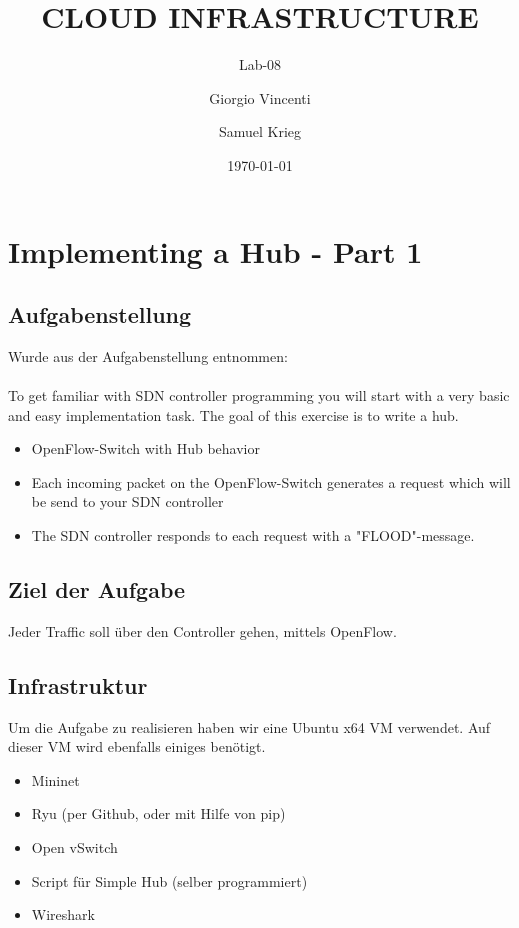 \documentclass[a4,12pt]{scrartcl}
\title{CLOUD INFRASTRUCTURE}
\subtitle{Lab-08}
\author{Giorgio Vincenti \and Samuel Krieg}
\date{\today}
\begin{document}
\clearpage\maketitle
\thispagestyle{empty}
\tableofcontents
\newpage

\section{Implementing a Hub - Part 1}

\subsection{Aufgabenstellung}
Wurde aus der Aufgabenstellung entnommen: \\
\\
To get familiar with SDN controller programming you will start with a very basic and easy implementation task. The goal of this exercise is to write a hub.
\begin{itemize}
\item OpenFlow-Switch with Hub behavior
\item Each incoming packet on the OpenFlow-Switch generates a request which will be send to your SDN controller
\item The SDN controller responds to each request with a "FLOOD"-message.
\end{itemize}

\subsection{Ziel der Aufgabe}
Jeder Traffic soll über den Controller gehen, mittels OpenFlow. 

\subsection{Infrastruktur}
Um die Aufgabe zu realisieren haben wir eine Ubuntu x64 VM verwendet. 
Auf dieser VM wird ebenfalls einiges benötigt. 
\begin{itemize}
\item Mininet 
\item Ryu (per Github, oder mit Hilfe von pip) 
\item Open vSwitch
\item Script für Simple Hub (selber programmiert) 
\item Wireshark 
\end{itemize}
\end{document}
